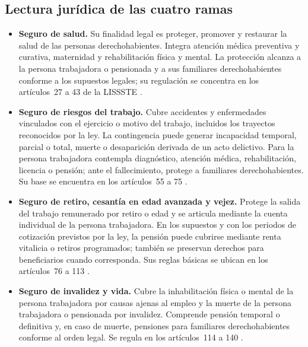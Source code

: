 \documentclass[12pt,letterpaper,oneside]{article}
\begin{document}
\subsection{Lectura jur\'idica de las cuatro ramas}

\begin{itemize}
  \item \textbf{Seguro de salud.} Su finalidad legal es proteger, promover y restaurar la salud de las personas derechohabientes. Integra atenci\'on m\'edica preventiva y curativa, maternidad y rehabilitaci\'on f\'isica y mental. La protecci\'on alcanza a la persona trabajadora o pensionada y a sus familiares derechohabientes conforme a los supuestos legales; su regulaci\'on se concentra en los art\'iculos~27 a 43 de la LISSSTE \citep{lissste2026,isssteSitio2026}.

  \item \textbf{Seguro de riesgos del trabajo.} Cubre accidentes y enfermedades vinculados con el ejercicio o motivo del trabajo, incluidos los trayectos reconocidos por la ley. La contingencia puede generar incapacidad temporal, parcial o total, muerte o desaparici\'on derivada de un acto delictivo. Para la persona trabajadora contempla diagn\'ostico, atenci\'on m\'edica, rehabilitaci\'on, licencia o pensi\'on; ante el fallecimiento, protege a familiares derechohabientes. Su base se encuentra en los art\'iculos~55 a 75 \citep{lissste2026}.

  \item \textbf{Seguro de retiro, cesant\'ia en edad avanzada y vejez.} Protege la salida del trabajo remunerado por retiro o edad y se articula mediante la cuenta individual de la persona trabajadora. En los supuestos y con los periodos de cotizaci\'on previstos por la ley, la pensi\'on puede cubrirse mediante renta vitalicia o retiros programados; tambi\'en se preservan derechos para beneficiarios cuando corresponda. Sus reglas b\'asicas se ubican en los art\'iculos~76 a 113 \citep{lissste2026,ramirezChavero2009}.

  \item \textbf{Seguro de invalidez y vida.} Cubre la inhabilitaci\'on f\'isica o mental de la persona trabajadora por causas ajenas al empleo y la muerte de la persona trabajadora o pensionada por invalidez. Comprende pensi\'on temporal o definitiva y, en caso de muerte, pensiones para familiares derechohabientes conforme al orden legal. Se regula en los art\'iculos~114 a 140 \citep{lissste2026,bricenoRuiz2011}.
\end{itemize}
\end{document}
